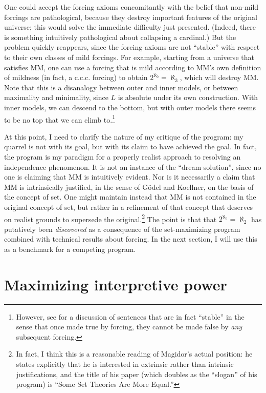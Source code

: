 \documentclass[letterpaper,12pt]{article}
\begin{document}
One could accept the forcing axioms concomitantly with the belief that non-mild forcings are pathological, because they destroy important features of the original universe; this would solve the immediate difficulty just presented. (Indeed, there is something intuitively pathological about collapsing a cardinal.) But the problem quickly reappears, since the forcing axioms are not ``stable'' with respect to their own classes of mild forcings. For example, starting from a universe that satisfies MM, one can use a forcing that is mild according to MM's own definition of mildness (in fact, a c.c.c. forcing) to obtain $2^{\aleph_0} = \aleph_3$, which will destroy MM. Note that this is a disanalogy between outer and inner models, or between maximality and minimality, since $L$ is absolute under its own construction. With inner models, we can descend to the bottom, but with outer models there seems to be no top that we can climb to.\footnote{However, see \cite{Hamkins2003-HAMASM} for a discussion of sentences that are in fact ``stable'' in the sense that once made true by forcing, they cannot be made false by \emph{any} subsequent forcing.}

At this point, I need to clarify the nature of my critique of the program: my quarrel is not with its goal, but with its claim to have achieved the goal. In fact, the program is my paradigm for a properly realist approach to resolving an independence phenomenon. It is not an instance of the ``dream solution'', since no one is claiming that MM is intuitively evident. Nor is it necessarily a claim that MM is intrinsically justified, in the sense of G\"odel and Koellner, on the basis of the concept of set. One might maintain instead that MM is not contained in the original concept of set, but rather in a refinement of that concept that deserves on realist grounds to supersede the original.\footnote{In fact, I think this is a reasonable reading of Magidor's actual position: he states explicitly that he is interested in extrinsic rather than intrinsic justifications, and the title of his paper (which doubles as the ``slogan'' of his program) is ``Some Set Theories Are More Equal.''} The point is that that $2^{\aleph_0} = \aleph_2$ has putatively been \emph{discovered} as a consequence of the set-maximizing program combined with technical results about forcing. In the next section, I will use this as a benchmark for a competing program.

\section{Maximizing interpretive power}
\label{maximizingpower}
\end{document}
